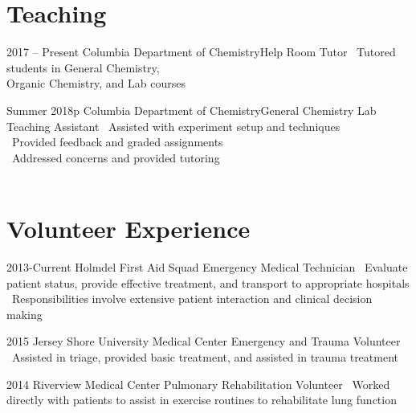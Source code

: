 \documentclass{bscv}
\begin{document}
\section{Teaching}
\begin{eventlist}
\item{2017 -- Present}
  {Columbia Department of Chemistry}{Help Room Tutor}
  \textbullet\  Tutored students in General Chemistry, \\  Organic Chemistry, and Lab courses

\item{Summer 2018}p
  {Columbia Department of Chemistry}{General Chemistry Lab Teaching Assistant}
  \textbullet\ Assisted with experiment setup and techniques \\
  \textbullet\ Provided feedback and graded assignments \\
  \textbullet\ Addressed concerns and provided tutoring \\
  \ \\
 
\end{eventlist}

\section{Volunteer Experience}

\begin{eventlist}
\item{2013-Current}
  {Holmdel First Aid Squad}
  {Emergency Medical Technician}
  {\textbullet\ Evaluate patient status, provide effective treatment, and transport to appropriate hospitals \newline \textbullet\ Responsibilities involve extensive patient interaction and clinical decision making}

\item{2015}
  {Jersey Shore University Medical Center}
  {Emergency and Trauma Volunteer}
  {\textbullet\ Assisted in triage, provided basic treatment, and assisted in trauma treatment}

\item{2014}
  {Riverview Medical Center}
  {Pulmonary Rehabilitation Volunteer}
  {\textbullet\ Worked directly with patients to assist in exercise routines to rehabilitate lung function}
  
\end{eventlist}

\end{document}
